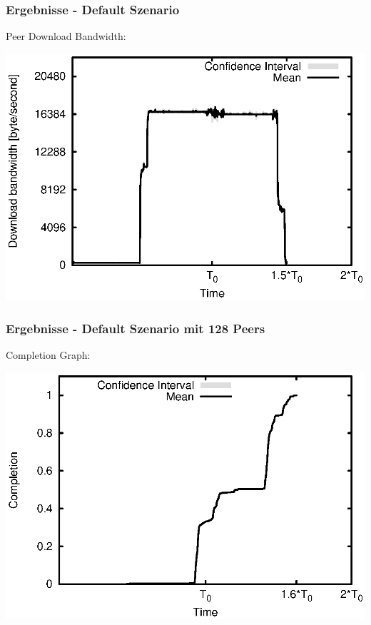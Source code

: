 \begin{frame}
  \frametitle{Ergebnisse - Default Szenario}
  Peer Download Bandwidth:
  
  \begin{center}
    \includegraphics[width=1\textwidth]{fig/plots/scenario_1_default/plots/GeneratedMeanCurrentDownloadBandwidth.csv.eps}
  \end{center}
\end{frame}


\begin{frame}
  \frametitle{Ergebnisse - Default Szenario mit 128 Peers}
  Completion Graph:
  
  \begin{center}
    \includegraphics[width=1\textwidth]{fig/plots/scenario_4_peer_count_128/plots/GeneratedMeanChunkCompletion.csv.eps}
  \end{center}
\end{frame}


